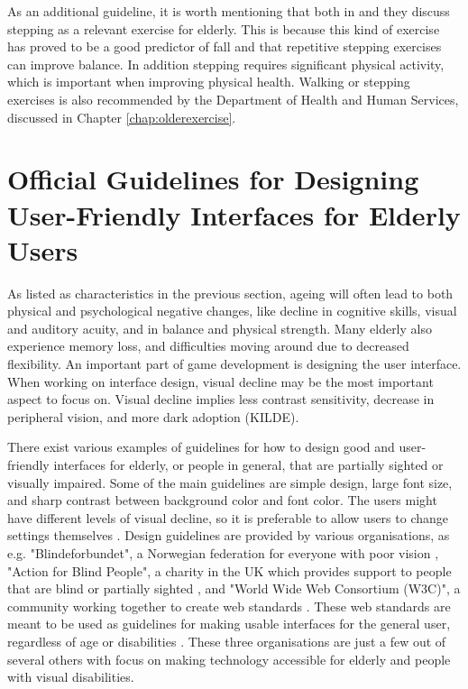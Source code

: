 As an additional guideline, it is worth mentioning that both in \cite{bruin} and \cite{gerling2} they discuss stepping as a relevant exercise for elderly. This is because this kind of exercise has proved to be a good predictor of fall and that repetitive stepping exercises can improve balance. In addition stepping requires significant physical activity, which is important when improving physical health. Walking or stepping exercises is also recommended by the Department of Health and Human Services, discussed in Chapter \ref{chap:olderexercise}.


\section{Official Guidelines for Designing User-Friendly Interfaces for Elderly Users}
\label{sec:designelderly}

As listed as characteristics in the previous section, ageing will often lead to both physical and psychological negative changes, like decline in cognitive skills, visual and auditory acuity, and in balance and physical strength. Many elderly also experience memory loss, and difficulties moving around due to decreased flexibility. An important part of game development is designing the user interface. When working on interface design, visual decline may be the most important aspect to focus on. Visual decline implies less contrast sensitivity, decrease in peripheral vision, and more dark adoption (KILDE). 

There exist various examples of guidelines for how to design good and user-friendly interfaces for elderly, or people in general, that are partially sighted or visually impaired. Some of the main guidelines are simple design, large font size, and sharp contrast between background color and font color. The users might have different levels of visual decline, so it is preferable to allow users to change settings themselves \cite{blindeforbundetTekst} \cite{actionforblindpeopleTekst} \cite{w3cTekst}. Design guidelines are provided by various organisations, as e.g. "Blindeforbundet", a Norwegian federation for everyone with poor vision \cite{blindeforbundet}, "Action for Blind People", a charity in the UK which provides support to people that are blind or partially sighted \cite{actionforblindpeople}, and "World Wide Web Consortium (W3C)", a community working together to create web standards \cite{w3c}. These web standards are meant to be used as guidelines for making usable interfaces for the general user, regardless of age or disabilities \cite{w3cTekst}. These three organisations are just a few out of several others with focus on making technology accessible for elderly and people with visual disabilities. 

